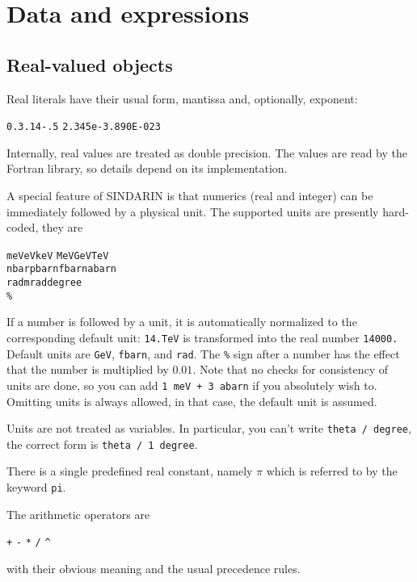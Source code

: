 \documentclass[12pt]{book}
\newcommand{\ttt}[1]{\texttt{#1}}
\begin{document}
\section{Data and expressions}

\subsection{Real-valued objects}
\label{sec:real}

Real literals have their usual form, mantissa and, optionally, exponent:
\begin{center}
\ttt{0.}\quad  \ttt{3.14}\quad \ttt{-.5}\quad
\ttt{2.345e-3}\quad \ttt{.890E-023}
\end{center}
Internally, real values are treated as double precision.  The values are read
by the Fortran library, so details depend on its implementation.

A special feature of SINDARIN is that numerics (real and integer) can be
immediately followed by a physical unit.  The supported units are presently
hard-coded, they are
\begin{center}
  \ttt{meV}\quad \ttt{eV}\quad \ttt{keV}\quad 
  \ttt{MeV}\quad \ttt{GeV}\quad \ttt{TeV}
\\
  \ttt{nbar}\quad \ttt{pbarn}\quad \ttt{fbarn}\quad \ttt{abarn}
\\
  \ttt{rad}\quad \ttt{mrad}\quad \ttt{degree}
\\
  \ttt{\%}
\end{center}
If a number is followed by a unit, it is automatically normalized to the
corresponding default unit: \ttt{14.TeV} is transformed into the real number
\ttt{14000.}  Default units are \ttt{GeV}, \ttt{fbarn}, and \ttt{rad}.  The
\ttt{\%} sign after a number has the effect that the number is multiplied by
$0.01$.  Note that no checks for consistency of units are done, so you can add
\ttt{1 meV + 3 abarn} if you absolutely wish to.  Omitting units is always
allowed, in that case, the default unit is assumed.

Units are not treated as variables.  In particular, you can't write \ttt{theta
  / degree}, the correct form is \ttt{theta / 1 degree}.

There is a single predefined real constant, namely $\pi$ which is referred to
by the keyword \ttt{pi}.

The arithmetic operators are
\begin{center}
  \verb|+| \verb|-| \verb|*| \verb|/| \verb|^|
\end{center}
with their obvious meaning and the usual precedence rules.  
\end{document}
